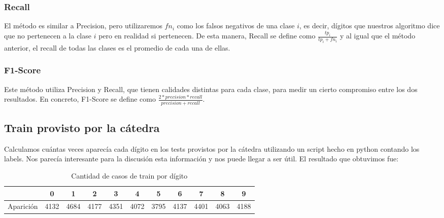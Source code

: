 \subsubsection{Recall}

El m\'etodo es similar a Precision, pero utilizaremos $fn_i$ como los falsos negativos de una clase $i$, es decir, d\'igitos que nuestros algoritmo dice que no pertenecen a la clase $i$ pero en realidad si pertenecen. De esta manera, Recall se define como $\frac{tp_i}{tp_i+fn_i}$ y al igual que el m\'etodo anterior, el recall de todas las clases es el promedio de cada una de ellas.

\subsubsection{F1-Score}

Este m\'etodo utiliza Precision y Recall, que tienen calidades distintas para cada clase, para medir un cierto compromiso entre los dos resultados. En concreto, F1-Score se define como $\frac{2 * precision * recall}{precision + recall}$.

\subsection{Train provisto por la c\'atedra}

Calculamos cu\'antas veces aparec\'ia cada d\'igito en los tests provistos por la c\'atedra utilizando un script hecho en python contando los labels. Nos parec\'ia interesante para la discusi\'on esta informaci\'on y nos puede llegar a ser \'util. El resultado que obtuvimos fue:

\begin{table}[H]
\centering
\begin{tabular}{| l | c | c | c | c | c | c | c | c | c | c |}
\hline
& 0 & 1 & 2 & 3 & 4 & 5 & 6 & 7 & 8 & 9 \\
\hline
Aparici\'on & 4132 & 4684 & 4177 & 4351 & 4072 & 3795 & 4137 & 4401 & 4063 & 4188\\

\hline
\end{tabular}
\caption{Cantidad de casos de train por d\'igito}
\end{table}